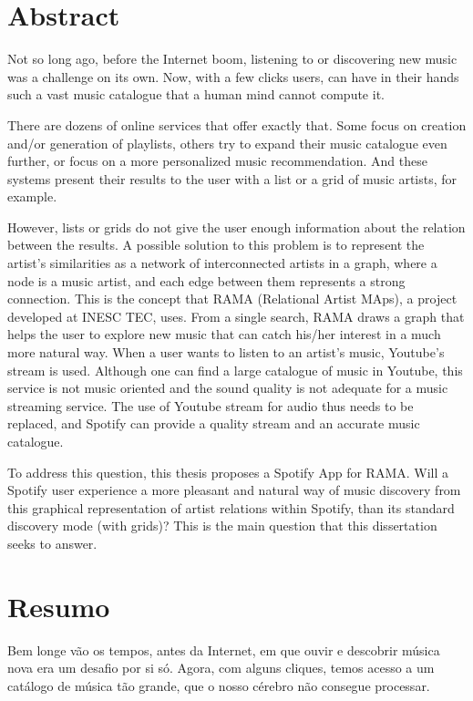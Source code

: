 
\chapter*{Abstract}

Not so long ago, before the Internet boom, listening to or discovering new music was a challenge on its own.
Now, with a few clicks users, can have in their hands such a vast music catalogue that a human mind cannot compute it.

There are dozens of online services that offer  exactly that.
Some focus on creation and/or generation of playlists, others try to expand their music catalogue even further, or focus on a more personalized music recommendation.
And these systems present their results to the user with a list or a grid of music artists, for example.

However, lists or grids do not give the user enough information about the relation between the results.
A possible solution to this problem is to represent the artist's similarities as a network of interconnected artists in a graph, where a node is a music artist, and each edge between them represents a strong connection.
This is the concept that RAMA (Relational Artist MAps), a project developed at INESC TEC, uses.
From a single search, RAMA draws a graph that helps the user to explore new music that can catch his/her interest in a much more natural way.
When a user wants to listen to an artist's music, Youtube's stream is used.
Although one can find a large catalogue of music in Youtube, this service is not music oriented and the sound quality is not adequate for a music streaming service.
The use of Youtube stream for audio thus needs to be replaced, and Spotify can provide a quality stream and an accurate music catalogue.

To address this question, this thesis proposes a Spotify App for RAMA.
Will a Spotify user experience a more pleasant and natural way of music discovery from this graphical representation of artist relations within Spotify, than its standard discovery mode (with grids)?
This is the main question that this dissertation seeks to answer.

\chapter*{Resumo}

Bem longe vão os tempos, antes da Internet, em que ouvir e descobrir música nova era um desafio por si só.
Agora, com alguns cliques, temos acesso a um catálogo de música tão grande, que o nosso cérebro não consegue processar.


